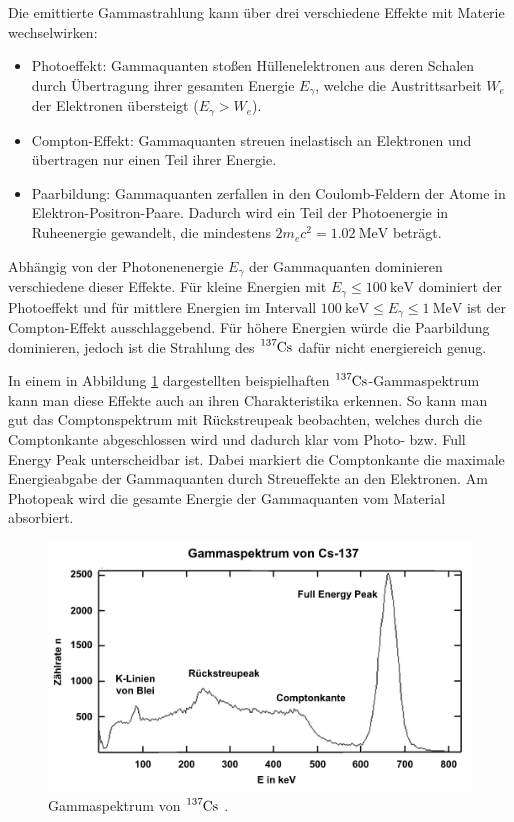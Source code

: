 Die emittierte Gammastrahlung kann über drei verschiedene Effekte mit Materie
wechselwirken:

\begin{itemize}
    \item Photoeffekt: Gammaquanten stoßen Hüllenelektronen aus deren Schalen durch Übertragung ihrer gesamten Energie $E_\gamma$,
    welche die Austrittsarbeit $W_e$ der Elektronen übersteigt ($E_\gamma > W_e$).
    \item Compton-Effekt: Gammaquanten streuen inelastisch an Elektronen und übertragen nur einen Teil ihrer Energie.
    \item Paarbildung: Gammaquanten zerfallen in den Coulomb-Feldern der Atome in Elektron-Positron-Paare. Dadurch
    wird ein Teil der Photoenergie in Ruheenergie gewandelt, die mindestens $2 m_e c^2 = \SI{1.02}{\mega\eV}$ beträgt.
\end{itemize}

Abhängig von der Photonenenergie $E_\gamma$ der Gammaquanten dominieren verschiedene dieser Effekte. 
Für kleine Energien mit $E_\gamma \leq \SI{100}{\kilo\eV}$ dominiert der Photoeffekt und für
mittlere Energien im Intervall $\SI{100}{\kilo\eV} \leq E_\gamma \leq \SI{1}{\mega\eV}$ ist der Compton-Effekt ausschlaggebend.
Für höhere Energien würde die Paarbildung dominieren, jedoch ist die Strahlung des $\ce{^{137}Cs}$ dafür nicht energiereich genug.

In einem in Abbildung \ref{fig:spektrum} dargestellten beispielhaften $\ce{^{137}Cs}$-Gammaspektrum kann man diese
Effekte auch an ihren Charakteristika erkennen. So kann man gut das Comptonspektrum mit Rückstreupeak beobachten, welches 
durch die Comptonkante abgeschlossen wird und dadurch klar vom Photo- bzw. Full Energy Peak unterscheidbar ist.
Dabei markiert die Comptonkante die maximale Energieabgabe der Gammaquanten durch Streueffekte an den Elektronen.
Am Photopeak wird die gesamte Energie der Gammaquanten vom Material absorbiert.

\vspace{-5pt}
\begin{figure}
    \centering
    \includegraphics[scale=0.6]{content/spektrum.png}
    \vspace{-10pt}
    \caption{Gammaspektrum von $\ce{^{137}Cs}$ \cite{leifi}.}
    \label{fig:spektrum}
\end{figure}
\vspace{-5pt}

